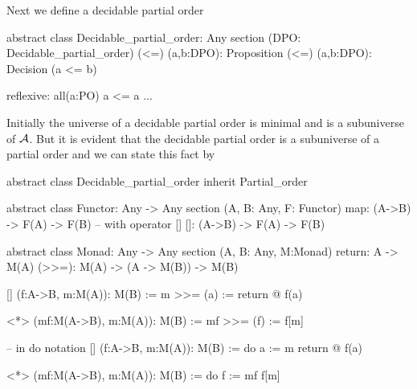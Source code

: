 Next we define a decidable partial order
%
\begin{alba}
  abstract class Decidable_partial_order: Any
    section (DPO: Decidable_partial_order)
      (<=) (a,b:DPO): Proposition
      (<=) (a,b:DPO): Decision (a <= b)

      reflexive: all(a:PO)
        a <= a
      ...
\end{alba}
%
Initially the universe of a decidable partial order is minimal and is a
subuniverse of $\cal{A}$. But it is evident that the decidable partial order is a
subuniverse of a partial order and we can state this fact by
%
\begin{alba}
  abstract class Decidable_partial_order inherit Partial_order
\end{alba}



\begin{alba}
  abstract class
    Functor: Any -> Any
  section (A, B: Any, F: Functor)
    map: (A->B) -> F(A) -> F(B)
    -- with operator []
    []:  (A->B) -> F(A) -> F(B)
\end{alba}


\begin{alba}
  abstract class Monad: Any -> Any
    section (A, B: Any, M:Monad)
      return: A -> M(A)
      (>>=): M(A) -> (A -> M(B)) -> M(B)

      [] (f:A->B, m:M(A)): M(B) :=
        m >>= (a) := return @ f(a)

      <*> (mf:M(A->B), m:M(A)): M(B) :=
        mf >>= (f) := f[m]

      -- in do notation
      [] (f:A->B, m:M(A)): M(B) :=
        do
          a := m
          return @ f(a)

      <*> (mf:M(A->B), m:M(A)): M(B) :=
        do
          f := mf
          f[m]
\end{alba}








